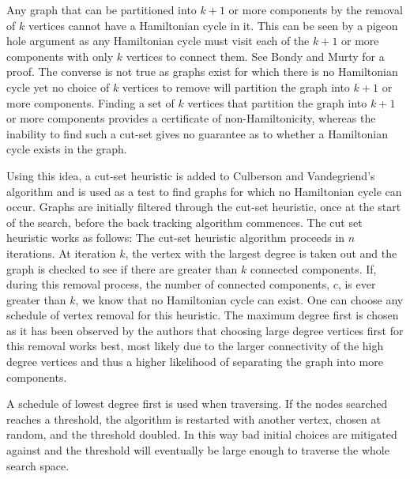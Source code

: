 \documentclass[twoside,11pt]{article}
\begin{document}
Any graph that can be partitioned into $k+1$ or more components by the removal of $k$ vertices cannot have a Hamiltonian cycle in it.
This can be seen by a pigeon hole argument as any Hamiltonian cycle must visit each of the $k+1$ or more components with only
$k$ vertices to connect them.  See Bondy and Murty \citeyear{bondy} for a proof.
The converse is not true as graphs exist for which there is no Hamiltonian cycle yet no choice of $k$
vertices to remove will partition the graph into $k+1$ or more components.  Finding a set of $k$ vertices that partition
the graph into $k+1$ or more components provides a certificate of non-Hamiltonicity, whereas the inability to find
such a cut-set gives no guarantee as to whether a Hamiltonian cycle exists in the graph.

Using this idea, a cut-set heuristic is added to Culberson and Vandegriend's algorithm and is used as a test
to find graphs for which no Hamiltonian cycle can occur.
Graphs are initially filtered through the cut-set heuristic, once at the start of the search, before the back tracking algorithm commences.
The cut set heuristic works as follows: The cut-set heuristic algorithm proceeds in
$n$ iterations.  At iteration $k$,
the vertex with the largest degree is taken out and the graph is checked
to see if there are greater than $k$ connected components.  If, during this removal process, the number of connected components, $c$, is
ever greater than $k$, we know that no Hamiltonian cycle can exist.
One can choose any schedule of vertex removal
for this heuristic.  The maximum degree first is chosen
as it has been 
observed by the authors
that choosing large degree vertices first for this removal works best, most
likely due to the larger connectivity of the high degree vertices and thus a higher likelihood of separating
the graph into more components.

A schedule of lowest degree first is used when traversing.  If the nodes searched reaches a threshold, the algorithm
is restarted with another vertex, chosen at random, and the threshold doubled.  In this way bad initial choices are
mitigated against and the threshold will eventually be large enough to traverse the whole search space.
\end{document}
